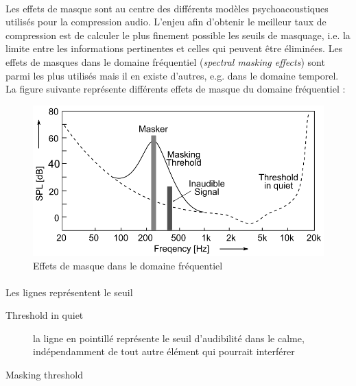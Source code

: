 \documentclass{article}
\begin{document}
    \paragraph{}
    Les effets de masque sont au centre des différents modèles psychoacoustiques utilisés pour la compression audio. L'enjeu afin d'obtenir le meilleur taux de compression est de calculer le plus finement possible les seuils de masquage, i.e. la limite entre les informations pertinentes et celles qui peuvent être éliminées. Les effets de masques dans le domaine fréquentiel (\emph{spectral masking effects}) sont parmi les plus utilisés mais il en existe d'autres, e.g. dans le domaine temporel. La figure suivante représente différents effets de masque du domaine fréquentiel :
    \begin{figure}[H]
        \centering
        \includegraphics[width=.6\linewidth]{./images/2019-Herre-Dick-masking-effect.png}
        \caption{Effets de masque dans le domaine fréquentiel\cite{2019-Herre-Dick}}
    \end{figure}

    \paragraph{}
    Les lignes représentent le seuil 
    \begin{description}
        \item[Threshold in quiet] la ligne en pointillé représente le seuil d'audibilité dans le calme, indépendamment de tout autre élément qui pourrait interférer
        \item[Masking threshold] 
    \end{description}
\end{document}
